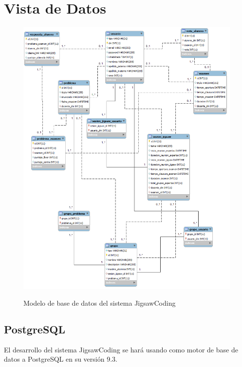 \section{Vista de Datos}
\begin{figure}[!h]
  \centering
  \includegraphics[scale=0.45]{figuras/sad/modelo_de_datos.png}\\
  \caption[Modelo de datos]{Modelo de base de datos del sistema JigsawCoding}\label{fig:modelo_de_datos}
\end{figure}
\subsection{PostgreSQL}
El desarrollo del sistema JigsawCoding se hará usando como motor de base de datos a PostgreSQL en su versión 9.3. 
